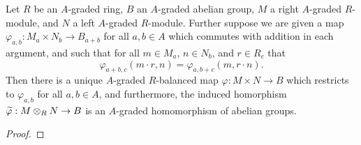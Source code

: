 \documentclass[../main.tex]{subfiles}
\begin{document}
\begin{lemma}\label{tensor_lift_of_A_graded_is_A_graded}
	Let $R$ be an $A$-graded ring, $B$ an $A$-graded abelian group, $M$ a right $A$-graded $R$-module, and $N$ a left $A$-graded $R$-module. Further suppose we are given a map $\varphi_{a,b}:M_a\times N_b\to B_{a+b}$ for all $a,b\in A$ which commutes with addition in each argument, and such that for all $m\in M_a$, $n\in N_b$, and $r\in R_c$ that
	\[\varphi_{a+b,c}(m\cdot r,n)=\varphi_{a,b+c}(m,r\cdot n).\]
	Then there is a unique $A$-graded $R$-balanced map $\varphi:M\times N\to B$ which restricts to $\varphi_{a,b}$ for all $a,b\in A$, and furthermore, the induced homorphism $\widetilde\varphi:M\otimes_RN\to B$ is an $A$-graded homomorphism of abelian groups.
\end{lemma}
\begin{proof}
\end{proof}

\end{document}
